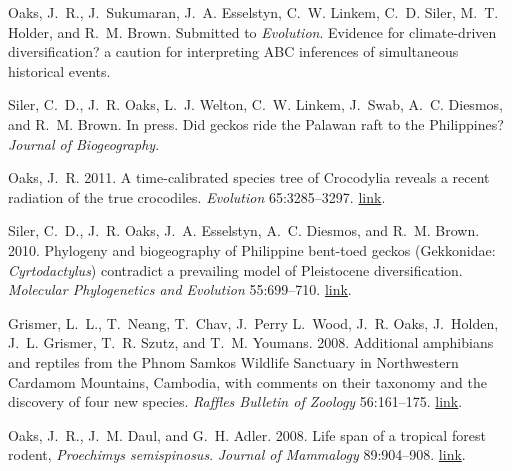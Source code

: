 \documentclass[10pt]{article}
\begin{document}
%
\begin{thebibliography}{6}
\providecommand{\natexlab}[1]{#1}
\providecommand{\url}[1]{\texttt{#1}}
\providecommand{\urlprefix}{URL }

Oaks, J.~R., J.~Sukumaran, J.~A. Esselstyn, C.~W. Linkem, C.~D. Siler, M.~T.
  Holder, and R.~M. Brown. Submitted to \emph{Evolution}.
\newblock Evidence for climate-driven diversification? a caution for
  interpreting {ABC} inferences of simultaneous historical events.

Siler, C.~D., J.~R. Oaks, L.~J. Welton, C.~W. Linkem, J.~Swab, A.~C. Diesmos,
  and R.~M. Brown. In press.
\newblock Did geckos ride the {P}alawan raft to the {P}hilippines?
\newblock \emph{Journal of Biogeography}.

Oaks, J.~R. 2011.
\newblock A time-calibrated species tree of {C}rocodylia reveals a recent
  radiation of the true crocodiles.
\newblock \emph{Evolution} 65:3285--3297.
\newblock
  \href{http://onlinelibrary.wiley.com/doi/10.1111/j.1558-5646.2011.01373.x/abstract}{link}.

Siler, C.~D., J.~R. Oaks, J.~A. Esselstyn, A.~C. Diesmos, and R.~M. Brown.
  2010.
\newblock Phylogeny and biogeography of {P}hilippine bent-toed geckos
  ({G}ekkonidae: \emph{{C}yrtodactylus}) contradict a prevailing model of
  {P}leistocene diversification.
\newblock \emph{Molecular Phylogenetics and Evolution} 55:699--710.
\newblock
  \href{http://www.sciencedirect.com/science/article/pii/S1055790310000382}{link}.

Grismer, L.~L., T.~Neang, T.~Chav, J.~Perry L.~Wood, J.~R. Oaks, J.~Holden,
  J.~L. Grismer, T.~R. Szutz, and T.~M. Youmans. 2008.
\newblock Additional amphibians and reptiles from the {P}hnom {S}amkos
  {W}ildlife {S}anctuary in {N}orthwestern {C}ardamom {M}ountains, {C}ambodia,
  with comments on their taxonomy and the discovery of four new species.
\newblock \emph{Raffles Bulletin of Zoology} 56:161--175.
\newblock
  \href{http://rmbr.nus.edu.sg/rbz/biblio/56/56rbz161-175.pdf}{link}.

Oaks, J.~R., J.~M. Daul, and G.~H. Adler. 2008.
\newblock Life span of a tropical forest rodent, \emph{{P}roechimys
  semispinosus}.
\newblock \emph{Journal of Mammalogy} 89:904--908.
\newblock \href{http://dx.doi.org/10.1644/07-MAMM-A-045.1}{link}.

\end{thebibliography}
\end{document}
